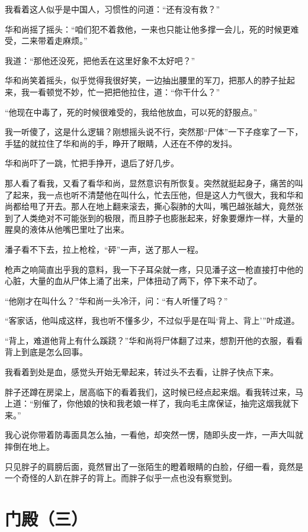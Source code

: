 我看着这人似乎是中国人，习惯性的问道：“还有没有救？”

华和尚摇了摇头：“咱们犯不着救他，一来也只能让他多撑一会儿，死的时候更难受，二来带着走麻烦。”

我道：“那他还没死，把他丢在这里好象不太好吧？”

华和尚笑着摇头，似乎觉得我很好笑，一边抽出腰里的军刀，把那人的脖子扯起来，我一看顿觉不妙，忙一把把他拉住，道：“你干什么？”

“他现在中毒了，死的时候很难受的，我给他放血，可以死的舒服点。”

我一听傻了，这是什么逻辑？刚想摇头说不行，突然那“尸体”一下子痉挛了一下，手猛的就拉住了华和尚的手，睁开了眼睛，人还在不停的发抖。

华和尚吓了一跳，忙把手挣开，退后了好几步。

那人看了看我，又看了看华和尚，显然意识有所恢复。突然就挺起身子，痛苦的叫了起来，我一点也听不清楚他在叫什么，忙去压他，但是这人力气很大，我和华和尚都给甩了开去。那人在地上翻来滚去，撕心裂肺的大叫，嘴巴越张越大，竟然张到了人类绝对不可能张到的极限，而且脖子也膨胀起来，好象要爆炸一样，大量的腥臭的液体从他嘴巴里吐了出来。

潘子看不下去，拉上枪栓，“砰”一声，送了那人一程。

枪声之响简直出乎我的意料，我一下子耳朵就一疼，只见潘子这一枪直接打中他的心脏，大量的血从尸体上涌了出来，尸体扭动了两下，停下来不动了。

“他刚才在叫什么？”华和尚一头冷汗，问：“有人听懂了吗？”

“客家话，他叫成这样，我也听不懂多少，不过似乎是在叫‘背上、背上’”叶成道。

“背上，难道他背上有什么蹊跷？”华和尚将尸体翻了过来，想割开他的衣服，看看背上到底是怎么回事。

我看着到处是血，感觉头开始无晕起来，转过头不去看，让胖子快点下来。

胖子还蹲在房梁上，居高临下的看着我们，这时候已经点起来烟。看我转过来，马上道：“别催了，你他娘的快和我老娘一样了，我向毛主席保证，抽完这烟我就下来。”

我心说你带着防毒面具怎么抽，一看他，却突然一愣，随即头皮一炸，一声大叫就摔倒在地上。

只见胖子的肩膀后面，竟然冒出了一张陌生的瞪着眼睛的白脸，仔细一看，竟然是一个奇怪的人趴在胖子的背上。而胖子似乎一点也没有察觉到。

\chapter{门殿（三）}

